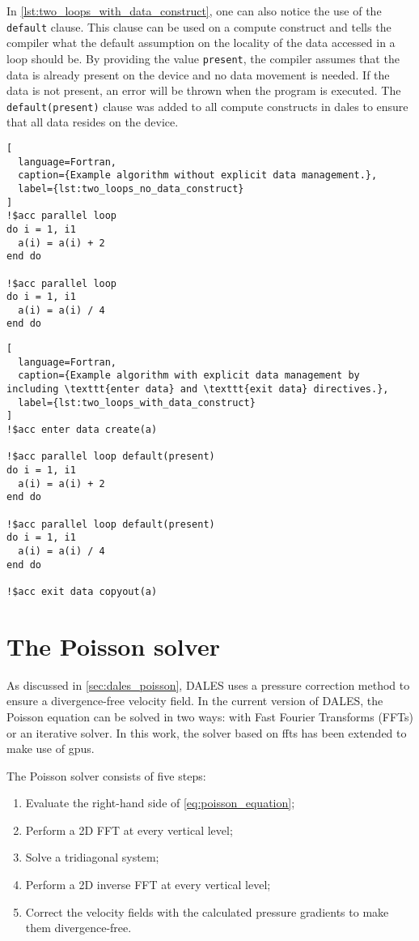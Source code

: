 In \autoref{lst:two_loops_with_data_construct}, one can also notice the use of the \texttt{default} clause. This clause can be used on a compute construct and tells the compiler what the default assumption on the locality of the data accessed in a loop should be. By providing the value \texttt{present}, the compiler assumes that the data is already present on the device and no data movement is needed. If the data is not present, an error will be thrown when the program is executed. The \texttt{default(present)} clause was added to all compute constructs in \acrshort{dales} to ensure that all data resides on the device.

\begin{lstlisting}[
  language=Fortran,
  caption={Example algorithm without explicit data management.},
  label={lst:two_loops_no_data_construct}
]
!$acc parallel loop
do i = 1, i1
  a(i) = a(i) + 2
end do

!$acc parallel loop
do i = 1, i1
  a(i) = a(i) / 4
end do
\end{lstlisting}

\begin{lstlisting}[
  language=Fortran,
  caption={Example algorithm with explicit data management by including \texttt{enter data} and \texttt{exit data} directives.},
  label={lst:two_loops_with_data_construct}
]
!$acc enter data create(a)

!$acc parallel loop default(present)
do i = 1, i1
  a(i) = a(i) + 2
end do

!$acc parallel loop default(present)
do i = 1, i1
  a(i) = a(i) / 4
end do

!$acc exit data copyout(a)
\end{lstlisting}

\section{The Poisson solver}
As discussed in \autoref{sec:dales_poisson}, DALES uses a pressure correction method to ensure a divergence-free velocity field. In the current version of DALES, the Poisson equation can be solved in two ways: with Fast Fourier Transforms (FFTs) or an iterative solver. In this work, the solver based on \acrshort{fft}s has been extended to make use of \acrshort{gpu}s. 

The Poisson solver consists of five steps:

\begin{enumerate}
  \item Evaluate the right-hand side of \autoref{eq:poisson_equation};
  \item Perform a 2D FFT at every vertical level;
  \item Solve a tridiagonal system;
  \item Perform a 2D inverse FFT at every vertical level;
  \item Correct the velocity fields with the calculated pressure gradients to make them divergence-free.
\end{enumerate}

